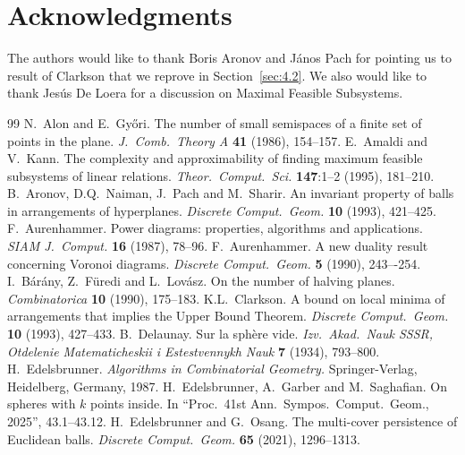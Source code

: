 \documentclass[a4paper,UKenglish,cleveref, autoref,numberwithinsect]{socg-lipics-v2021}
\theoremstyle{plain}
\begin{document}
\section*{Acknowledgments}
The authors would like to thank Boris Aronov and J\'anos Pach for pointing us to result of Clarkson that we reprove in Section~\ref{sec:4.2}. We also would like to thank Jes\'us De Loera for a discussion on Maximal Feasible Subsystems. 
\begin{thebibliography}{99}
{\sc N.\ Alon and E.\ Gy\H{o}ri.}
The number of small semispaces of a finite set of points in the plane.
\emph{J.\ Comb.\ Theory A} {\bf 41} (1986), 154--157.
{\sc E.\ Amaldi and V.\ Kann.}
The complexity and approximability of finding maximum feasible subsystems of linear relations.
\emph{Theor.\ Comput.\ Sci.} {\bf 147}:1--2 (1995), 181--210.
{\sc B.\ Aronov, D.Q.\ Naiman, J.\ Pach and M.\ Sharir.}
An invariant property of balls in arrangements of hyperplanes.
\emph{Discrete Comput.\ Geom.} {\bf 10} (1993), 421--425.
{\sc F.\ Aurenhammer.}
Power diagrams: properties, algorithms and applications.
\emph{SIAM J.\ Comput.} {\bf 16} (1987), 78--96.
{\sc F.\ Aurenhammer.}
A new duality result concerning Voronoi diagrams. 
\emph{Discrete Comput.\ Geom.} {\bf 5} (1990), 243–-254.
{\sc I.\ B\'ar\'any, Z.\ F\"uredi and L.\ Lov\'asz.}
On the number of halving planes. 
\emph{Combinatorica} {\bf 10} (1990), 175--183.
{\sc K.L.\ Clarkson.}
A bound on local minima of arrangements that implies the Upper Bound Theorem.
\emph{Discrete Comput.\ Geom.} {\bf 10} (1993), 427--433.
{\sc B.\ Delaunay.}
Sur la sph\`{e}re vide.
\emph{Izv.\ Akad.\ Nauk SSSR, Otdelenie Matematicheskii i Estestvennykh Nauk} {\bf 7} (1934), 793--800.
{\sc H.\ Edelsbrunner.}
\emph{Algorithms in Combinatorial Geometry.}
Springer-Verlag, Heidelberg, Germany, 1987.
{\sc H.\ Edelsbrunner, A.\ Garber and M.\ Saghafian.}
On spheres with $k$ points inside.
In ``Proc.\ 41st Ann.\ Sympos.\ Comput.\ Geom., 2025'', 43.1--43.12.
{\sc H.\ Edelsbrunner and G.\ Osang.}
The multi-cover persistence of Euclidean balls.
\emph{Discrete Comput.\ Geom.} {\bf 65} (2021), 1296--1313.

\end{thebibliography}
\end{document}

